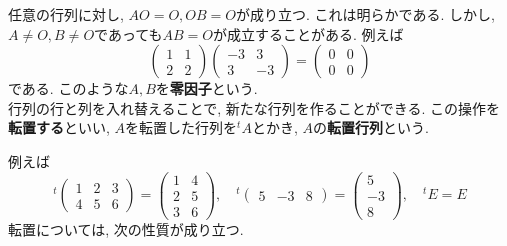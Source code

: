 \documentclass[a4j,dvipdfmx]{jsarticle}
\numberwithin{equation}{section}
\begin{document}
            任意の行列に対し, $AO=O,OB=O$が成り立つ. これは明らかである. しかし, $A\neq O,B\neq O$であっても$AB=O$が成立することがある.
            例えば
            \begin{equation*}
                \begin{pmatrix}
                    1 & 1 \\ 2 & 2
                \end{pmatrix}
                \begin{pmatrix}
                    -3 & 3 \\ 3 & -3
                \end{pmatrix}
                =\begin{pmatrix}
                    0 & 0 \\ 0 & 0
                \end{pmatrix}
            \end{equation*}
            である. このような$A,B$を\textbf{零因子}という.\\

            行列の行と列を入れ替えることで, 新たな行列を作ることができる. この操作を\textbf{転置する}といい,
            $A$を転置した行列を$^t\!A$とかき, $A$の\textbf{転置行列}という.

            例えば
            \begin{equation*}
                ^t\!\begin{pmatrix}
                    1 & 2 & 3\\
                    4 & 5 & 6
                \end{pmatrix}
                =\begin{pmatrix}
                    1 & 4\\
                    2 & 5\\
                    3 & 6
                \end{pmatrix}
                ,\quad
                ^t\!\begin{pmatrix}
                    5 & -3 & 8
                \end{pmatrix}
                =\begin{pmatrix}
                    5 \\ -3 \\ 8
                \end{pmatrix}
                ,\quad
                ^t\!E = E
            \end{equation*}
            転置については, 次の性質が成り立つ.
\end{document}
